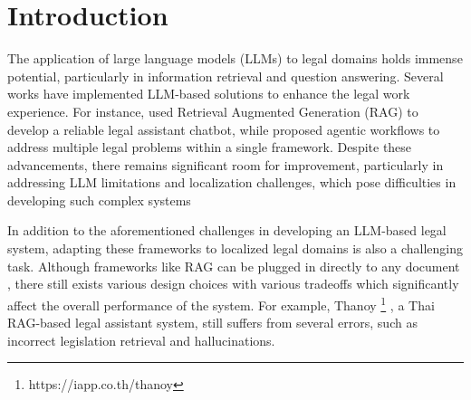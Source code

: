 \section{Introduction}
\label{sec:introduction}

The application of large language models (LLMs) to legal domains holds immense potential, particularly in information retrieval and question answering.
%
Several works have implemented LLM-based solutions to enhance the legal work experience. 
%
For instance, \cite{lexisnexis,thomsonreutersAIpoweredLegal} used Retrieval Augmented Generation (RAG) to develop a reliable legal assistant chatbot, while \cite{leewayhertzAgentsLegal} proposed agentic workflows to address multiple legal problems within a single framework. 
%
Despite these advancements, there remains significant room for improvement, particularly in addressing LLM limitations and localization challenges, which pose difficulties in developing such complex systems \cite{Dahl_2024,magesh2024hallucinationfreeassessingreliabilityleading}


In addition to the aforementioned challenges in developing an LLM-based legal system, adapting these frameworks to localized legal domains is also a challenging task. 
%
Although frameworks like RAG can be plugged in directly to any document \cite{originalRAG}, there still exists various design choices with various tradeoffs which significantly affect the overall performance of the system. 
%
For example, Thanoy \footnote{https://iapp.co.th/thanoy} \cite{thanoy}, a Thai RAG-based legal assistant system, still suffers from several errors, such as incorrect legislation retrieval and hallucinations.





